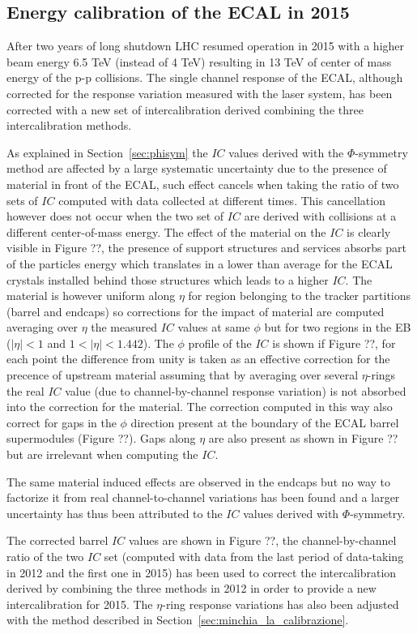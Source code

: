 \subsection{Energy calibration of the ECAL in 2015}
\label{sec:calib_2015}

After two years of long shutdown LHC resumed operation in 2015 with a higher beam energy 6.5 TeV (instead of 4 TeV) resulting
in 13 TeV of center of mass energy of the p-p collisions. The single channel response of the ECAL, although corrected
for the response variation measured with the laser system, has been corrected with a new set of intercalibration
derived combining the three intercalibration methods.

As explained in Section~\ref{sec:phisym} the $IC$ values derived with the $\Phi$-symmetry method are affected by
a large systematic uncertainty due to the presence of material in front of the ECAL, such effect cancels when taking
the ratio of two sets of $IC$ computed with data collected at different times. This cancellation however does not occur
when the two set of $IC$ are derived with collisions at a different center-of-mass energy.
The effect of the material on the $IC$ is clearly visible in Figure ??, the presence of support structures and services
absorbs part of the particles energy which translates in a lower than average \sumEt for the ECAL crystals installed
behind those structures which leads to a higher $IC$. The material is however uniform along $\eta$ for region belonging
to the tracker partitions (barrel and endcaps) so corrections for the impact of material are computed averaging
over $\eta$ the measured $IC$ values at same $\phi$ but for two regions in the EB ($|\eta|<1$ and $1<|\eta|<1.442$).
The $\phi$ profile of the $IC$ is shown if Figure ??, for each point the difference from unity is taken as an effective
correction for the precence of upstream material assuming that by averaging over several $\eta$-rings the real
$IC$ value (due to channel-by-channel response variation) is not absorbed into the correction for the material.
The correction computed in this way also correct for gaps in the $\phi$ direction present at the boundary of the ECAL barrel
supermodules (Figure ??). Gaps along $\eta$ are also present as shown in Figure ?? but are irrelevant when computing
the $IC$.

The same material induced effects are observed in the endcaps but no way to factorize it from real channel-to-channel
variations has been found and a larger uncertainty has thus been attributed to the $IC$ values derived with $\Phi$-symmetry.

The corrected barrel $IC$ values are shown in Figure ??, the channel-by-channel ratio of the two $IC$ set (computed with
data from the last period of data-taking in 2012 and the first one in 2015) has been used to correct the intercalibration
derived by combining the three methods in 2012 in order to provide a new intercalibration for 2015. The $\eta$-ring
response variations has also been adjusted with the method described in Section~\ref{sec:minchia_la_calibrazione}.


  